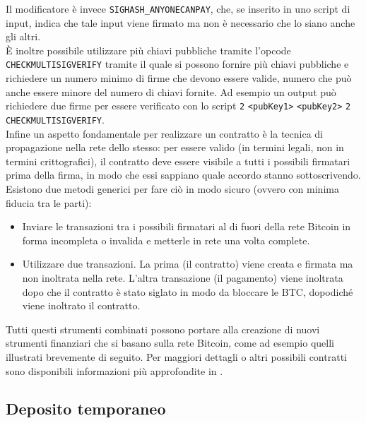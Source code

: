 Il modificatore è invece \verb|SIGHASH_ANYONECANPAY|, che, se inserito in uno script di input, indica che tale input viene firmato ma non è necessario che lo siano anche gli altri.\\
È inoltre possibile utilizzare più chiavi pubbliche tramite l'opcode \verb|CHECKMULTISIGVERIFY| tramite il quale si possono fornire più chiavi pubbliche e richiedere un numero minimo di firme che devono essere valide, numero che può anche essere minore del numero di chiavi fornite. Ad esempio un output può richiedere due firme per essere verificato con lo script \verb|2| \verb|<pubKey1>| \verb|<pubKey2>| \verb|2| \verb|CHECKMULTISIGVERIFY|.\\
Infine un aspetto fondamentale per realizzare un contratto è la tecnica di propagazione nella rete dello stesso: per essere valido (in termini legali, non in termini crittografici), il contratto deve essere visibile a tutti i possibili firmatari prima della firma, in modo che essi sappiano quale accordo stanno sottoscrivendo. Esistono due metodi generici per fare ciò in modo sicuro (ovvero con minima fiducia tra le parti):
\begin{itemize}
    \item Inviare le transazioni tra i possibili firmatari al di fuori della rete Bitcoin in forma incompleta o invalida e metterle in rete una volta complete.
    \item Utilizzare due transazioni. La prima (il contratto) viene creata e firmata ma non inoltrata nella rete. L'altra transazione (il pagamento) viene inoltrata dopo che il contratto è stato siglato in modo da bloccare le BTC, dopodiché viene inoltrato il contratto.
\end{itemize}

Tutti questi strumenti combinati possono portare alla creazione di nuovi strumenti finanziari che si basano sulla rete Bitcoin, come ad esempio quelli illustrati brevemente di seguito. Per maggiori dettagli o altri possibili contratti sono disponibili informazioni più approfondite in \cite{bitcoin-contracts,nick-szabo,bitter-better}.

\subsection{Deposito temporaneo}

